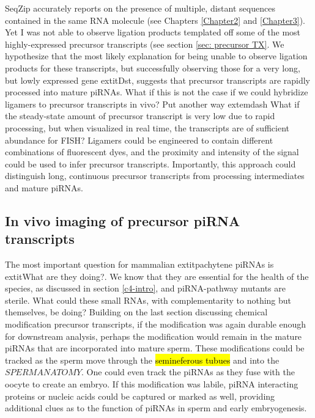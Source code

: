 {{    SeqZip accurately reports on the presence of multiple, distant sequences contained in the same RNA molecule (see Chapters \ref{Chapter2} and \ref{Chapter3}). Yet I was not able to observe ligation products templated off some of the most highly-expressed precursor transcripts (see section \ref{sec: precursor TX}. We hypothesize that the most likely explanation for being unable to observe ligation products for these transcripts, but successfully observing those for a very long, but lowly expressed gene   extit{Dst}, suggests that precursor transcripts are rapidly processed into mature piRNAs. What if this is not the case if we could hybridize ligamers to precursor transcripts in vivo? Put another way  extemdash What if the steady-state amount of precursor transcript is very low due to rapid processing, but when visualized in real time, the transcripts are of sufficient abundance for FISH? Ligamers could be engineered to contain different combinations of fluorescent dyes, and the proximity and intensity of the signal could be used to infer precursor transcripts. Importantly, this approach could distinguish long, continuous precursor transcripts from processing intermediates and mature piRNAs.

  \subsection{In vivo imaging of precursor piRNA transcripts}
    The most important question for mammalian   extit{pachytene} piRNAs is   extit{What are they doing?}. We know that they are essential for the health of the species, as discussed in section \ref{c4-intro}, and piRNA-pathway mutants are sterile. What could these small RNAs, with complementarity to nothing but themselves, be doing? Building on the last section discussing chemical modification precursor transcripts, if the modification was again durable enough for downstream analysis, perhaps the modification would remain in the mature piRNAs that are incorporated into mature sperm. These modifications could be tracked as the sperm move through the \hl{semineferous tubues} and into the $SPERM ANATOMY$. One could even track the piRNAs as they fuse with the oocyte to create an embryo. If this modification was labile, piRNA interacting proteins or nucleic acids could be captured or marked as well, providing additional clues as to the function of piRNAs in sperm and early embryogenesis.

}}
